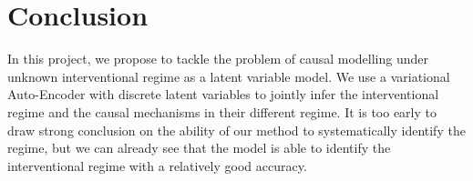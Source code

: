 \documentclass{article}
\begin{document}
\section{Conclusion}\label{subsec:Conclusion}

In this project, we propose to tackle the problem of causal modelling under
unknown interventional regime as a latent variable model. We use a variational
Auto-Encoder with discrete latent variables to jointly infer the interventional
regime and the causal mechanisms in their different regime. It is too early to
draw strong conclusion on the ability of our method to systematically identify
the regime, but we can already see that the model is able to identify the
interventional regime with a relatively good accuracy.



\end{document}
